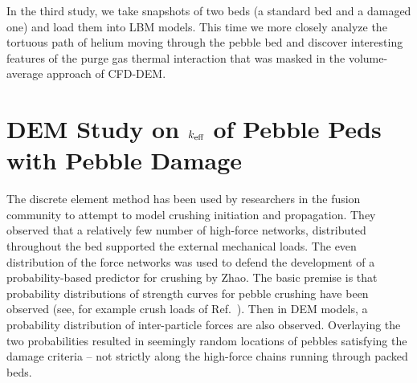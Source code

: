 In the third study, we take snapshots of two beds (a standard bed and a damaged one) and load them into LBM models. This time we more closely analyze the tortuous path of helium moving through the pebble bed and discover interesting features of the purge gas thermal interaction that was masked in the volume-average approach of CFD-DEM.









\section{DEM Study on $k_\text{eff}$ of Pebble Peds with Pebble Damage}\label{sec:dem-studies-effective-conductivity}


The discrete element method has been used by researchers in the fusion community to attempt to model crushing initiation and propagation\cite{Annabattula2012a, Zhao2012, Zhao2013}. They observed that a relatively few number of high-force networks, distributed throughout the bed supported the external mechanical loads. The even distribution of the force networks was used to defend the development of a probability-based predictor for crushing by Zhao\etal.\cite{Zhao2013} The basic premise is that probability distributions of strength curves for pebble crushing have been observed (see, for example crush loads of Ref.~\cite{Tsuchiya1998}). Then in DEM models, a probability distribution of inter-particle forces are also observed. Overlaying the two probabilities resulted in seemingly random locations of pebbles satisfying the damage criteria -- not strictly along the high-force chains running through packed beds.

